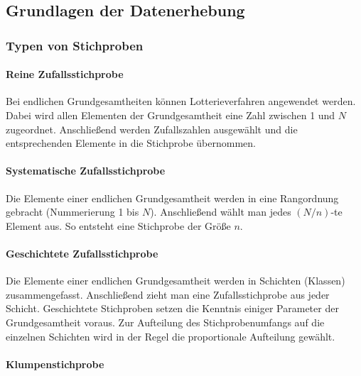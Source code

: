 \documentclass[
  ngerman,
]{article}
\begin{document}
\hypertarget{grundlagen-der-datenerhebung}{%
\subsection{Grundlagen der Datenerhebung}\label{grundlagen-der-datenerhebung}}

\hypertarget{typen-von-stichproben}{%
\subsubsection{Typen von Stichproben}\label{typen-von-stichproben}}

\hypertarget{reine-zufallsstichprobe}{%
\paragraph{Reine Zufallsstichprobe}\label{reine-zufallsstichprobe}}

Bei endlichen Grundgesamtheiten können Lotterieverfahren angewendet werden. Dabei wird allen Elementen der Grundgesamtheit eine Zahl zwischen 1 und \(N\) zugeordnet. Anschließend werden Zufallszahlen ausgewählt und die entsprechenden Elemente in die Stichprobe übernommen.

\hypertarget{systematische-zufallsstichprobe}{%
\paragraph{Systematische Zufallsstichprobe}\label{systematische-zufallsstichprobe}}

Die Elemente einer endlichen Grundgesamtheit werden in eine Rangordnung gebracht (Nummerierung 1 bis \(N\)). Anschließend wählt man jedes \((N/n)\)-te Element aus. So entsteht eine Stichprobe der Größe \(n\).

\hypertarget{geschichtete-zufallsstichprobe}{%
\paragraph{Geschichtete Zufallsstichprobe}\label{geschichtete-zufallsstichprobe}}

Die Elemente einer endlichen Grundgesamtheit werden in Schichten (Klassen) zusammengefasst. Anschließend zieht man eine Zufallsstichprobe aus jeder Schicht. Geschichtete Stichproben setzen die Kenntnis einiger Parameter der Grundgesamtheit voraus. Zur Aufteilung des Stichprobenumfangs auf die einzelnen Schichten wird in der Regel die proportionale Aufteilung gewählt.

\hypertarget{klumpenstichprobe}{%
\paragraph{Klumpenstichprobe}\label{klumpenstichprobe}}
\end{document}
